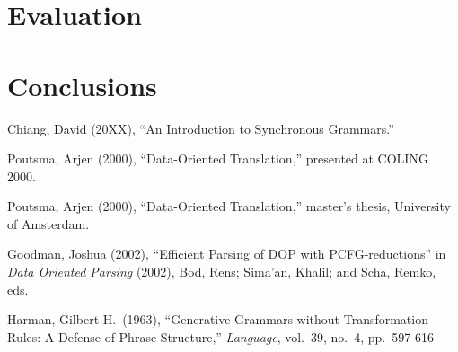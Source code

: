 \documentclass[a4paper]{article}
\theoremstyle{definition}
\begin{document}
\section{Evaluation}
\label{sec:eval}

\section{Conclusions}
\label{sec:conc}

\begin{thebibliography}{BlAbLa00}

 Chiang, David (20XX), ``An Introduction to Synchronous Grammars.''

 Poutsma, Arjen (2000), ``Data-Oriented Translation,'' presented at
	COLING 2000.

 Poutsma, Arjen (2000), ``Data-Oriented Translation,'' master's
	thesis, University of Amsterdam.

 Goodman, Joshua (2002), ``Efficient Parsing of DOP with
	PCFG-reductions'' in \emph{Data Oriented Parsing} (2002), Bod, Rens;
	Sima'an, Khalil; and Scha, Remko, eds.

 Harman, Gilbert H.\ (1963), ``Generative Grammars without
	Transformation Rules: A Defense of Phrase-Structure,'' \emph{Language},
	vol.\ 39, no.\ 4, pp.\ 597-616

\end{thebibliography}
\end{document}
